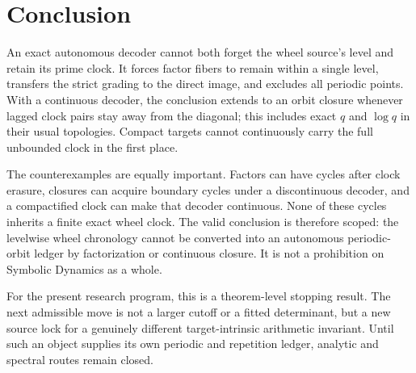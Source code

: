 \section{Conclusion}
\label{sec:conclusion}

An exact autonomous decoder cannot both forget the wheel source's level and
retain its prime clock.  It forces factor fibers to remain within a single
level, transfers the strict grading to the direct image, and excludes all
periodic points.  With a continuous decoder, the conclusion extends to an
orbit closure whenever lagged clock pairs stay away from the diagonal; this
includes exact $q$ and $\log q$ in their usual topologies.  Compact targets
cannot continuously carry the full unbounded clock in the first place.

The counterexamples are equally important.  Factors can have cycles after
clock erasure, closures can acquire boundary cycles under a discontinuous
decoder, and a compactified clock can make that decoder continuous.  None of
these cycles inherits a finite exact wheel clock.  The valid conclusion is
therefore scoped: the levelwise wheel chronology cannot be converted into an
autonomous periodic-orbit ledger by factorization or continuous closure.
It is not a prohibition on Symbolic Dynamics as a whole.

For the present research program, this is a theorem-level stopping result.
The next admissible move is not a larger cutoff or a fitted determinant, but
a new source lock for a genuinely different target-intrinsic arithmetic
invariant.  Until such an object supplies its own periodic and repetition
ledger, analytic and spectral routes remain closed.
